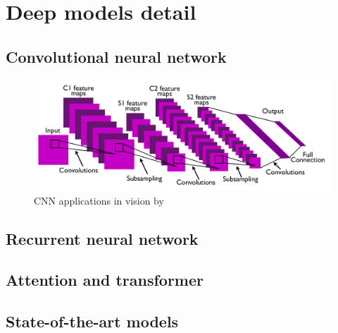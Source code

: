 \section{Deep models detail}
\label{sec:Deep models detail}
\subsection{Convolutional neural network}
\citet{fukushima1980neocognitron}

\citet{zhang1988shift}

\begin{figure}[ht!]
    \centering
    \includegraphics[width=\textwidth]{literature/imgs/ext-lecun-cnn-arch.png}
    \caption{CNN applications in vision by \citet{lecun2010convolutional}}
    \label{fig:ext-lecun-cnn-arch}
\end{figure}

\citet{lecun2010convolutional}

\citet{gu2018recent}

\subsection{Recurrent neural network}
\citet{jordan1997serial}

\citet{hochreiter1997long}

\citet{sherstinsky2020fundamentals}

\citet{chung2014empirical}

\subsection{Attention and transformer}
\citet{bahdanau2016neural}

\citet{vaswani2017attention}

\citet{devlin2019bert}

\citet{lohit2019temporal}

\subsection{State-of-the-art models}

\citet{srinivas2021bottleneck}

\citet{wang2021pyramid}

\citet{dai2021coatnet}
